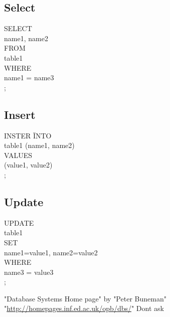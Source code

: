 \documentclass[11pt,twoside,a4paper]{article}
\begin{document}
     \subsection{Select}
    	  \begin{tabbing}
    	    SELECT \= \\
    	    \>name1, name2                \\
    	    FROM                          \\
    	    \>table1                      \\
    	    WHERE                         \\
    	    \>name1 = name3               \\
      		;
      	\end{tabbing}
    
    \subsection{Insert}
    	  \begin{tabbing}
    	    INSTER \= INTO                \\
    	    \>table1 (name1, name2)       \\
    	    VALUES                        \\
    	    \>(value1, value2)            \\
      		;
      	\end{tabbing}
     
     \subsection{Update}
    	  \begin{tabbing}
    	    UPDATE \=                    \\
    	    \>table1                      \\
    	    SET                           \\
    	    \>name1=value1, name2=value2  \\
    	    WHERE                         \\
    	    \>name3 = value3              \\
      		;
      	\end{tabbing}
    		  
  
  \clearpage  
  \begin{thebibliography}{9}
      "Database Systems Home page" by "Peter Buneman" \\
      "\url{http://homepages.inf.ed.ac.uk/opb/dbs/}"
      Dont ask
  \end{thebibliography}
\end{document}
